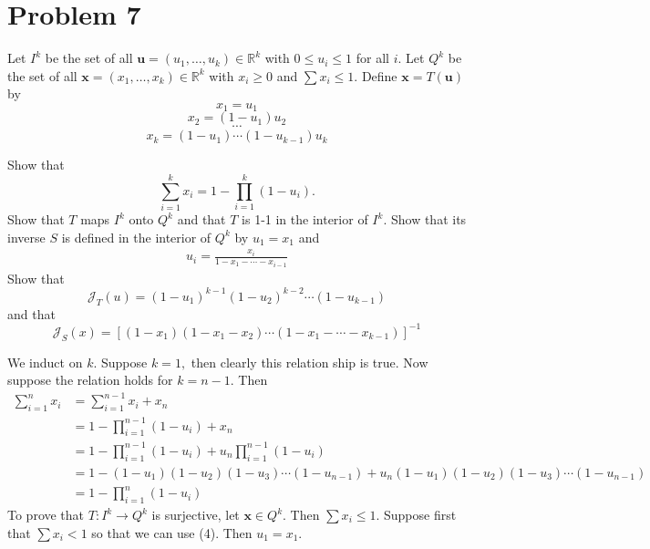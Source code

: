 \documentclass[11pt]{article}
\newcommand{\bbR}{\mathbb{R}}
\begin{document}
\section*{Problem 7}
\begin{problem}
    Let $I^k$ be the set of all $\textbf{u} = (u_1, \dots, u_k)\in \bbR^k$ with $0\leq u_i \leq 1$ for all $i.$ Let $Q^k$ be the set of all $\textbf{x} = (x_1, \dots, x_k)\in \bbR^k$ with $x_i \geq 0$ and $\sum x_i \leq 1.$ Define $\textbf{x} = T(\textbf{u})$ by 
    \[x_1 = u_1\]
    \[x_2 = (1-u_1)u_2\]
    \[\cdots\]
    \[x_k = (1-u_1)\cdots (1-u_{k-1})u_k\]

    Show that 
    \[\sum_{i=1}^k x_i = 1 - \prod_{i=1}^k (1-u_i).\] Show that $T$ maps $I^k$ onto $Q^k$ and that $T$ is 1-1 in the interior of $I^k.$ Show that its inverse $S$ is defined in the interior of $Q^k$ by $u_1 = x_1$ and 
    \begin{align}
    u_i = \frac{x_i}{1 - x_1 - \cdots - x_{i-1}}    
    \end{align}
    Show that 
    \[\mathcal{J}_T(u) = (1-u_1)^{k-1}(1-u_2)^{k-2}\cdots (1-u_{k-1})\] and that 
    \[\mathcal{J}_S(x) = \left[(1-x_1)(1-x_1 - x_2)\cdots (1-x_1 - \cdots - x_{k-1})\right]^{-1}\]
\end{problem}
\begin{solution}
We induct on $k.$ Suppose $k = 1,$ then clearly this relation ship is true. Now suppose the relation holds for $k = n-1.$ Then 
\begin{align*}
    \sum_{i=1}^n x_i &= \sum_{i=1}^{n-1}x_i + x_n\\
    &= 1 - \prod_{i=1}^{n-1}(1-u_i) + x_n\\
    &= 1 - \prod_{i=1}^{n-1}(1-u_i) + u_n\prod_{i=1}^{n-1} (1-u_i)\\
    &= 1- (1-u_1)(1-u_2)(1-u_3)\cdots(1-u_{n-1}) + u_n(1-u_1)(1-u_2)(1-u_3)\cdots(1-u_{n-1})\\
    &= 1 - \prod_{i=1}^n (1-u_i)
\end{align*}
To prove that $T: I^k \to Q^k$ is surjective, let $\textbf{x}\in Q^k.$ Then $\sum x_i \leq 1.$ Suppose first that $\sum x_i < 1$ so that we can use  (4). Then $u_1 = x_1.$ 
\end{solution}

\newpage
\end{document}
